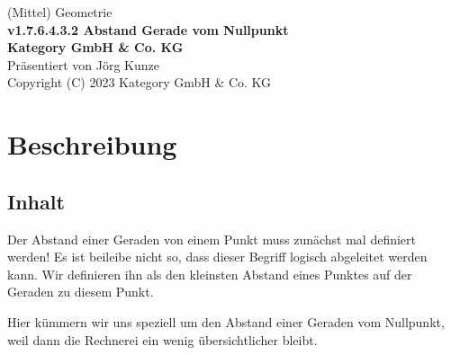 \documentclass[a4paper]{amsart}
\theoremstyle{definition}
\begin{document}
\begin{titlepage}
\centering
{\huge
(Mittel) Geometrie\\[1cm]
\textbf{v1.7.6.4.3.2 Abstand Gerade vom Nullpunkt}
}\\[1cm]

\textbf{Kategory GmbH \& Co. KG}\\
Präsentiert von Jörg Kunze\\
Copyright (C) 2023 Kategory GmbH \& Co. KG

\end{titlepage}

%

\newpage

\section*{Beschreibung}

\subsection*{Inhalt}
Der Abstand einer Geraden von einem Punkt muss zunächst mal definiert werden! Es ist beileibe nicht so, dass dieser Begriff logisch abgeleitet werden kann. Wir definieren ihn als den kleinsten Abstand eines Punktes auf der Geraden zu diesem Punkt.

Hier kümmern wir uns speziell um den Abstand einer Geraden vom Nullpunkt, weil dann die Rechnerei ein wenig übersichtlicher bleibt.
\end{document}
